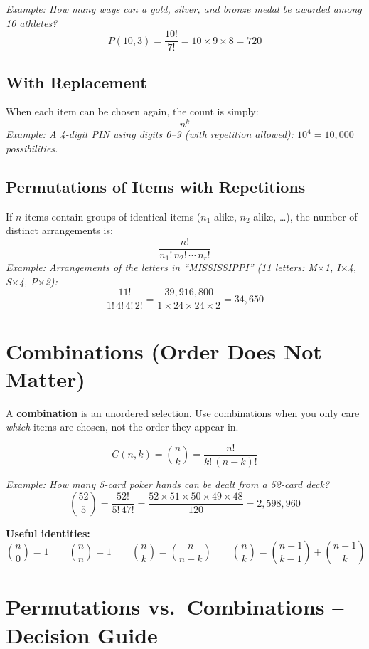 \documentclass[11pt, letterpaper]{article}
\begin{document}
\textit{Example: How many ways can a gold, silver, and bronze medal be awarded among 10 athletes?}
\[
  P(10, 3) = \frac{10!}{7!} = 10 \times 9 \times 8 = 720
\]

\subsection*{With Replacement}
When each item can be chosen again, the count is simply:
\[
  n^k
\]
\textit{Example: A 4-digit PIN using digits 0--9 (with repetition allowed): $10^4 = 10{,}000$ possibilities.}

\subsection*{Permutations of Items with Repetitions}
If $n$ items contain groups of identical items ($n_1$ alike, $n_2$ alike, \ldots), the number of distinct arrangements is:
\[
  \frac{n!}{n_1!\, n_2!\, \cdots\, n_r!}
\]
\textit{Example: Arrangements of the letters in ``MISSISSIPPI'' (11 letters: M$\times$1, I$\times$4, S$\times$4, P$\times$2):}
\[
  \frac{11!}{1!\,4!\,4!\,2!} = \frac{39{,}916{,}800}{1 \times 24 \times 24 \times 2} = 34{,}650
\]

\section*{Combinations (Order Does Not Matter)}

A \textbf{combination} is an unordered selection. Use combinations when you only care \emph{which} items are chosen, not the order they appear in.

\[
  C(n, k) = \binom{n}{k} = \frac{n!}{k!\,(n-k)!}
\]

\textit{Example: How many 5-card poker hands can be dealt from a 52-card deck?}
\[
  \binom{52}{5} = \frac{52!}{5!\,47!} = \frac{52 \times 51 \times 50 \times 49 \times 48}{120} = 2{,}598{,}960
\]

\textbf{Useful identities:}
\[
  \binom{n}{0} = 1 \qquad \binom{n}{n} = 1 \qquad \binom{n}{k} = \binom{n}{n-k} \qquad \binom{n}{k} = \binom{n-1}{k-1} + \binom{n-1}{k}
\]

\section*{Permutations vs.\ Combinations -- Decision Guide}
\end{document}

